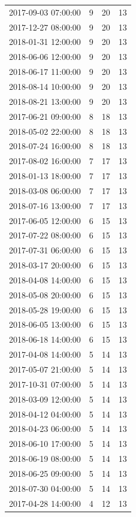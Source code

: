 \begin{tabular}{lrrr}
2017-09-03 07:00:00 & 9 & 20 & 13 \\
2017-12-27 08:00:00 & 9 & 20 & 13 \\
2018-01-31 12:00:00 & 9 & 20 & 13 \\
2018-06-06 12:00:00 & 9 & 20 & 13 \\
2018-06-17 11:00:00 & 9 & 20 & 13 \\
2018-08-14 10:00:00 & 9 & 20 & 13 \\
2018-08-21 13:00:00 & 9 & 20 & 13 \\
2017-06-21 09:00:00 & 8 & 18 & 13 \\
2018-05-02 22:00:00 & 8 & 18 & 13 \\
2018-07-24 16:00:00 & 8 & 18 & 13 \\
2017-08-02 16:00:00 & 7 & 17 & 13 \\
2018-01-13 18:00:00 & 7 & 17 & 13 \\
2018-03-08 06:00:00 & 7 & 17 & 13 \\
2018-07-16 13:00:00 & 7 & 17 & 13 \\
2017-06-05 12:00:00 & 6 & 15 & 13 \\
2017-07-22 08:00:00 & 6 & 15 & 13 \\
2017-07-31 06:00:00 & 6 & 15 & 13 \\
2018-03-17 20:00:00 & 6 & 15 & 13 \\
2018-04-08 14:00:00 & 6 & 15 & 13 \\
2018-05-08 20:00:00 & 6 & 15 & 13 \\
2018-05-28 19:00:00 & 6 & 15 & 13 \\
2018-06-05 13:00:00 & 6 & 15 & 13 \\
2018-06-18 14:00:00 & 6 & 15 & 13 \\
2017-04-08 14:00:00 & 5 & 14 & 13 \\
2017-05-07 21:00:00 & 5 & 14 & 13 \\
2017-10-31 07:00:00 & 5 & 14 & 13 \\
2018-03-09 12:00:00 & 5 & 14 & 13 \\
2018-04-12 04:00:00 & 5 & 14 & 13 \\
2018-04-23 06:00:00 & 5 & 14 & 13 \\
2018-06-10 17:00:00 & 5 & 14 & 13 \\
2018-06-19 08:00:00 & 5 & 14 & 13 \\
2018-06-25 09:00:00 & 5 & 14 & 13 \\
2018-07-30 04:00:00 & 5 & 14 & 13 \\
2017-04-28 14:00:00 & 4 & 12 & 13 \\

\end{tabular}

